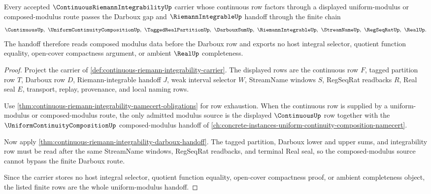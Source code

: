 \begin{theorem}
\label{thm:continuous-riemann-integrability-uniform-modulus-handoff}
Every accepted $\ContinuousRiemannIntegrabilityUp$ carrier whose continuous row factors through a displayed uniform-modulus or composed-modulus route passes the Darboux gap and $\RiemannIntegrableUp$ handoff through the finite chain
$$
\ContinuousUp,\ \UniformContinuityCompositionUp,\ \TaggedRealPartitionUp,\ \DarbouxSumUp,\ \RiemannIntegrableUp,\ \StreamNameUp,\ \RegSeqRatUp,\ \RealUp .
$$
The handoff therefore reads composed modulus data before the Darboux row and exports no host integral selector, quotient function equality, open-cover compactness argument, or ambient $\RealUp$ completeness.
\end{theorem}
\begin{proof}
Project the carrier of \autoref{def:continuous-riemann-integrability-carrier}. The displayed rows are the continuous row $F$, tagged partition row $T$, Darboux row $D$, Riemann-integrable handoff $J$, weak interval selector $W$, StreamName windows $S$, RegSeqRat readbacks $R$, Real seal $E$, transport, replay, provenance, and local naming rows.

Use \autoref{thm:continuous-riemann-integrability-namecert-obligations} for row exhaustion. When the continuous row is supplied by a uniform-modulus or composed-modulus route, the only admitted modulus source is the displayed $\ContinuousUp$ row together with the $\UniformContinuityCompositionUp$ composed-modulus handoff of \autoref{ch:concrete-instances-uniform-continuity-composition-namecert}.

Now apply \autoref{thm:continuous-riemann-integrability-darboux-handoff}. The tagged partition, Darboux lower and upper sums, and integrability row must be read after the same StreamName windows, RegSeqRat readbacks, and terminal Real seal, so the composed-modulus source cannot bypass the finite Darboux route.

Since the carrier stores no host integral selector, quotient function equality, open-cover compactness proof, or ambient completeness object, the listed finite rows are the whole uniform-modulus handoff.
\end{proof}


